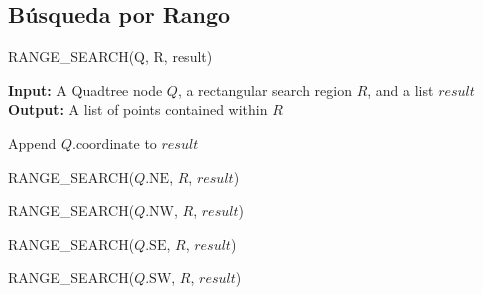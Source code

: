 \documentclass[9pt,a4paper,twoside]{rho-class/rho}
\begin{document}
        \subsection{Búsqueda por Rango}
            \begin{algorithm}
                \caption{RANGE\_SEARCH(Q, R, result)}
                \begin{algorithmic}[1]
                    \Statex \textbf{Input:} A Quadtree node $Q$, a rectangular search region $R$, and a list $result$
                    \Statex \textbf{Output:} A list of points contained within $R$
                    
                        \State \Return {}
                    \EndIf
                    
                        \State Append $Q.\text{coordinate}$ to $result$ 
                    \EndIf
                    
                        \State RANGE\_SEARCH($Q.\text{NE}$, $R$, $result$)
                    \EndIf
                    
                        \State RANGE\_SEARCH($Q.\text{NW}$, $R$, $result$)
                    \EndIf
                    
                        \State RANGE\_SEARCH($Q.\text{SE}$, $R$, $result$)
                    \EndIf
                    
                        \State RANGE\_SEARCH($Q.\text{SW}$, $R$, $result$)
                    \EndIf
                    
                    \State \Return {}
                
                \end{algorithmic}
            \end{algorithm}
\end{document}

